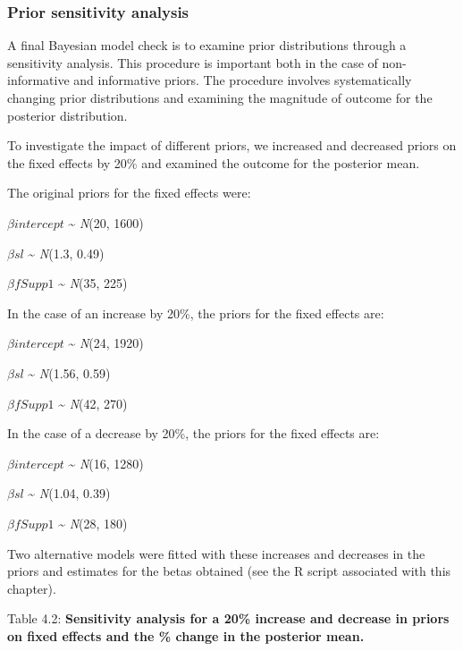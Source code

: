\documentclass[
]{book}
\begin{document}
\hypertarget{prior-sensitivity-analysis}{%
\subsubsection{Prior sensitivity analysis}\label{prior-sensitivity-analysis}}

A final Bayesian model check is to examine prior distributions through a sensitivity analysis. This procedure is important both in the case of non-informative and informative priors. The procedure involves systematically changing prior distributions and examining the magnitude of outcome for the posterior distribution.

To investigate the impact of different priors, we increased and decreased priors on the fixed effects by 20\% and examined the outcome for the posterior mean.

The original priors for the fixed effects were:

\(\beta intercept\) \textasciitilde{} \emph{N}(20, 1600)

\(\beta sl\) \textasciitilde{} \emph{N}(1.3, 0.49)

\(\beta fSupp1\) \textasciitilde{} \emph{N}(35, 225)

In the case of an increase by 20\%, the priors for the fixed effects are:

\(\beta intercept\) \textasciitilde{} \emph{N}(24, 1920)

\(\beta sl\) \textasciitilde{} \emph{N}(1.56, 0.59)

\(\beta fSupp1\) \textasciitilde{} \emph{N}(42, 270)

In the case of a decrease by 20\%, the priors for the fixed effects are:

\(\beta intercept\) \textasciitilde{} \emph{N}(16, 1280)

\(\beta sl\) \textasciitilde{} \emph{N}(1.04, 0.39)

\(\beta fSupp1\) \textasciitilde{} \emph{N}(28, 180)

Two alternative models were fitted with these increases and decreases in the priors and estimates for the betas obtained (see the R script associated with this chapter).

Table 4.2: \textbf{Sensitivity analysis for a 20\% increase and decrease in priors on fixed effects and the \% change in the posterior mean.}
\end{document}
